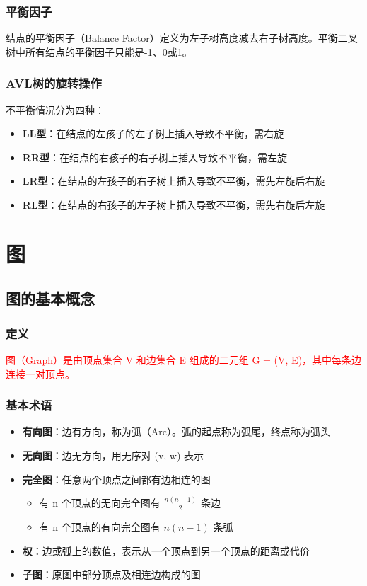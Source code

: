 \documentclass{../../note}
\begin{document}
\subsubsection{平衡因子}
结点的平衡因子（Balance Factor）定义为左子树高度减去右子树高度。平衡二叉树中所有结点的平衡因子只能是-1、0或1。

\subsubsection{AVL树的旋转操作}
不平衡情况分为四种：
\begin{itemize}
\item \textbf{LL型}：在结点的左孩子的左子树上插入导致不平衡，需右旋
\item \textbf{RR型}：在结点的右孩子的右子树上插入导致不平衡，需左旋
\item \textbf{LR型}：在结点的左孩子的右子树上插入导致不平衡，需先左旋后右旋
\item \textbf{RL型}：在结点的右孩子的左子树上插入导致不平衡，需先右旋后左旋
\end{itemize}

\section{图}

\subsection{图的基本概念}

\subsubsection{定义}
\textcolor{red}{图（Graph）是由顶点集合 V 和边集合 E 组成的二元组 G = (V, E)，其中每条边连接一对顶点。}

\subsubsection{基本术语}
\begin{itemize}
\item \textbf{有向图}：边有方向，称为弧（Arc）。弧的起点称为弧尾，终点称为弧头
\item \textbf{无向图}：边无方向，用无序对 (v, w) 表示
\item \textbf{完全图}：任意两个顶点之间都有边相连的图
  \begin{itemize}
    \item 有 n 个顶点的无向完全图有 $\frac{n(n-1)}{2}$ 条边
    \item 有 n 个顶点的有向完全图有 $n(n-1)$ 条弧
  \end{itemize}
\item \textbf{权}：边或弧上的数值，表示从一个顶点到另一个顶点的距离或代价
\item \textbf{子图}：原图中部分顶点及相连边构成的图
\end{itemize}
\end{document}
